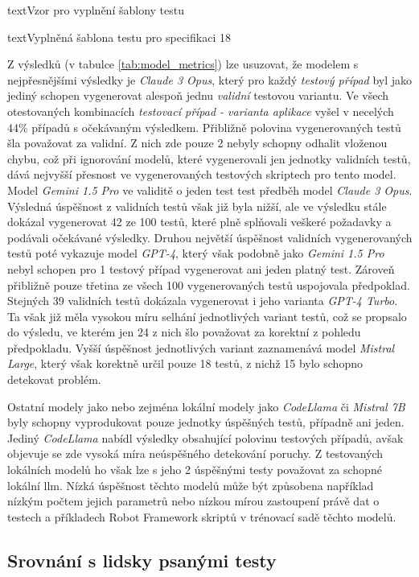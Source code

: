 \documentclass[czech, ma, kiv, he, iso690numb, pdf, viewonly]{fasthesis}
\begin{document}
\begin{code}{text}{Vzor pro vyplnění šablony testu \label{lst:template}}
{\begin{code}{text}{Vyplněná šablona testu pro specifikaci 18 \label{lst:spec18}}
{        Z výsledků (v tabulce \ref{tab:model_metrics}) lze usuzovat, že modelem s nejpřesnějšími výsledky je \textit{Claude 3 Opus}, který pro každý \textit{testový případ} byl jako jediný schopen vygenerovat alespoň jednu \textit{validní} testovou variantu. Ve všech otestovaných kombinacích \textit{testovací případ - varianta aplikace} vyšel v necelých 44\% případů s očekávaným výsledkem. Přibližně polovina vygenerovaných testů šla považovat za validní. Z nich zde pouze 2 nebyly schopny odhalit vloženou chybu, což při ignorování modelů, které vygenerovali jen jednotky validních testů, dává nejvyšší přesnost ve vygenerovaných testových skriptech pro tento model. Model \textit{Gemini 1.5 Pro} ve validitě o jeden test test předběh model \textit{Claude 3 Opus}. Výsledná úspěšnost z validních testů však již byla nižší, ale ve výsledku stále dokázal vygenerovat 42 ze 100 testů, které plně splňovali veškeré požadavky a podávali očekávané výsledky. Druhou největší úspěšnost validních vygenerovaných testů poté vykazuje model \textit{GPT-4}, který však podobně jako \textit{Gemini 1.5 Pro} nebyl schopen pro 1 testový případ vygenerovat ani jeden platný test. Zároveň přibližně pouze třetina ze všech 100 vygenerovaných testů uspojovala předpoklad. Stejných 39 validních testů dokázala vygenerovat i jeho varianta \textit{GPT-4 Turbo}. Ta však již měla vysokou míru selhání jednotlivých variant testů, což se propsalo do výsledu, ve kterém jen 24 z nich šlo považovat za korektní z pohledu předpokladu. Vyšší úspěšnost jednotlivých variant zaznamenává model \textit{Mistral Large}, který však korektně určil pouze 18 testů, z nichž 15 bylo schopno detekovat problém.

        Ostatní modely jako  nebo zejména lokální modely jako \textit{CodeLlama} či \textit{Mistral 7B} byly schopny vyprodukovat pouze jednotky úspěšných testů, případně ani jeden. Jediný \textit{CodeLlama} nabídl výsledky obsahující polovinu testových případů, avšak objevuje se zde vysoká míra neúspěšného detekování poruchy. Z testovaných lokálních modelů ho však lze s jeho 2 úspěšnými testy považovat za schopné lokální \Gls{llm}. Nízká úspěšnost těchto modelů může být způsobena například nízkým počtem jejich parametrů nebo nízkou mírou zastoupení právě dat o testech a příkladech Robot Framework skriptů v trénovací sadě těchto modelů.

        \subsection{Srovnání s lidsky psanými testy}

}
\end{code}}
\end{code}
\end{document}
